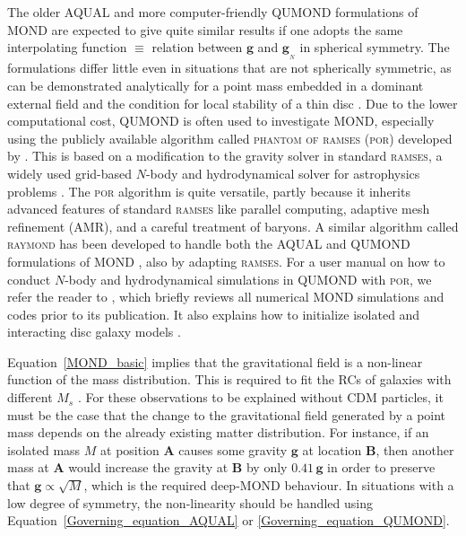 \documentclass[fleqn,usenatbib,useAMS]{mnras} %
\begin{document}
The older AQUAL and more computer-friendly QUMOND formulations of MOND are expected to give quite similar results \citep{Candlish_2016} if one adopts the same interpolating function $\equiv$ relation between $\bm{g}$ and $\bm{g}_{_N}$ in spherical symmetry. The formulations differ little even in situations that are not spherically symmetric, as can be demonstrated analytically for a point mass embedded in a dominant external field \citep{Banik_2018_EFE} and the condition for local stability of a thin disc \citep{Banik_2018_Toomre}. Due to the lower computational cost, QUMOND is often used to investigate MOND, especially using the publicly available algorithm called \textsc{phantom of ramses} (\textsc{por}) developed by \citet{Lughausen_2015}. This is based on a modification to the gravity solver in standard \textsc{ramses}, a widely used grid-based $N$-body and hydrodynamical solver for astrophysics problems \citep{Teyssier_2002}. The \textsc{por} algorithm is quite versatile, partly because it inherits advanced features of standard \textsc{ramses} like parallel computing, adaptive mesh refinement (AMR), and a careful treatment of baryons. A similar algorithm called \textsc{raymond} has been developed to handle both the AQUAL and QUMOND formulations of MOND \citep{Candlish_2015}, also by adapting \textsc{ramses}. For a user manual on how to conduct $N$-body and hydrodynamical simulations in QUMOND with \textsc{por}, we refer the reader to \citet{Nagesh_2021}, which briefly reviews all numerical MOND simulations and codes prior to its publication. It also explains how to initialize isolated and interacting disc galaxy models \citep[the disc templates are discussed further in][]{Banik_2020_M33}.

Equation~\ref{MOND_basic} implies that the gravitational field is a non-linear function of the mass distribution. This is required to fit the RCs of galaxies with different $M_s$ \citep{Milgrom_1983}. For these observations to be explained without CDM particles, it must be the case that the change to the gravitational field generated by a point mass depends on the already existing matter distribution. For instance, if an isolated mass $M$ at position $\bm{A}$ causes some gravity $\bm{g}$ at location $\bm{B}$, then another mass at $\bm{A}$ would increase the gravity at $\bm{B}$ by only $0.41 \, \bm{g}$ in order to preserve that $\bm{g} \propto \sqrt{M}$, which is the required deep-MOND behaviour. In situations with a low degree of symmetry, the non-linearity should be handled using Equation~\ref{Governing_equation_AQUAL} or \ref{Governing_equation_QUMOND}.
\end{document}
